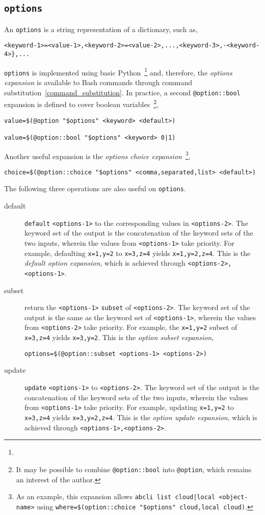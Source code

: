 \subsection{\texttt{options}}
\label{options}

An \texttt{options} is a string representation of a dictionary, such as,
%
\begin{verbatim}
<keyword-1>=<value-1>,<keyword-2>=<value-2>,...,<keyword-3>,-<keyword-4>},...
\end{verbatim}
%
\texttt{options} is implemented using basic Python~\footnote{} and, therefore, the \emph{options expansion} is available to Bash commands through command substitution~\ref{command_substitution}. In practice, a second \texttt{@option::bool} expansion is defined to cover boolean variables~\footnote{It may be possible to combine \texttt{@option::bool} into \texttt{@option}, which remains an interest of the author.},
%
\begin{verbatim}
value=$(@option "$options" <keyword> <default>)

value=$(@option::bool "$options" <keyword> 0|1)
\end{verbatim}
%
Another useful expansion is the \emph{options choice expansion}~\footnote{
As an example, this expansion allows \texttt{abcli list cloud|local <object-name>} using \texttt{where=\$(option::choice "\$options" cloud,local cloud)}.
},
%
\begin{verbatim}
choice=$(@option::choice "$options" <comma,separated,list> <default>)
\end{verbatim}
%
The following three operations are also useful on \texttt{options}.
%
\begin{description}
%
\item[default]{\texttt{default} \texttt{<options-1>} to the corresponding values in \texttt{<options-2>}. The keyword set of the output is the concatenation of the keyword sets of the two inputs, wherein the values from \texttt{<options-1>} take priority. For example, defaulting \texttt{x=1,y=2} to \texttt{x=3,z=4} yields \texttt{x=1,y=2,z=4}. This is the \emph{default option expansion}, which is achieved through \texttt{<options-2>,<options-1>}.}
%
\item[subset]{return the \texttt{<options-1>} \texttt{subset} of \texttt{<options-2>}. The keyword set of the output is the same as the keyword set of \texttt{<options-1>}, wherein the values from \texttt{<options-2>} take priority. For example, the \texttt{x=1,y=2} subset of \texttt{x=3,z=4} yields \texttt{x=3,y=2}. This is the \emph{option subset expansion},
\begin{verbatim}
options=$(@option::subset <options-1> <options-2>)
\end{verbatim}
}
%
\item[update]{\texttt{update} \texttt{<options-1>} to \texttt{<options-2>}. The keyword set of the output is the concatenation of the keyword sets of the two inputs, wherein the values from \texttt{<options-1>} take priority. For example, updating \texttt{x=1,y=2} to \texttt{x=3,z=4} yields \texttt{x=3,y=2,z=4}. This is the \emph{option update expansion}, which is achieved through \texttt{<options-1>,<options-2>}.}
%
\end{description}
